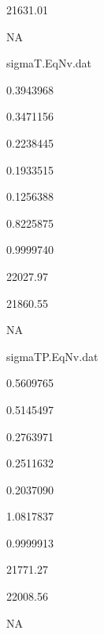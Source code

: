 \documentclass[
]{article}
\begin{document}
21631.01

NA

sigmaT.EqNv.dat

0.3943968

0.3471156

0.2238445

0.1933515

0.1256388

0.8225875

0.9999740

22027.97

21860.55

NA

sigmaTP.EqNv.dat

0.5609765

0.5145497

0.2763971

0.2511632

0.2037090

1.0817837

0.9999913

21771.27

22008.56

NA
\end{document}
